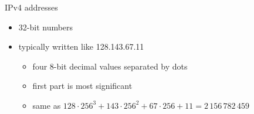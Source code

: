 \begin{frame}{IPv4 addresses}
    \begin{itemize}
    \item 32-bit numbers
    \item typically written like 128.143.67.11
        \begin{itemize}
        \item four 8-bit decimal values separated by dots
        \item first part is most significant
        \item same as $128\cdot 256^3+143\cdot 256^2 + 67\cdot256 + 11 = 2\,156\,782\,459$
        \end{itemize}
    \end{itemize}
\end{frame}
